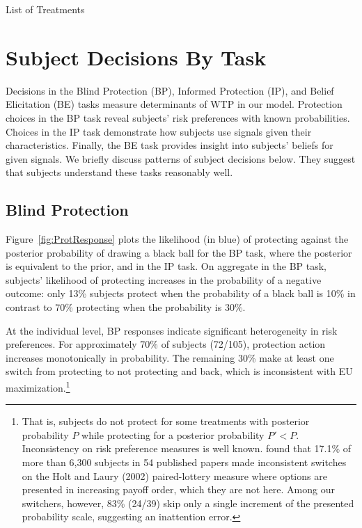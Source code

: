 \documentclass[12pt,a4paper]{article}
\begin{document}
\begin{table}[h!]
\caption{List of Treatments} \label{tab:treatments}

\end{table}


 


\vspace{20pt}
\section{Subject Decisions By Task}\label{sec:sanity}

Decisions in the Blind Protection (BP), Informed Protection (IP), and Belief Elicitation (BE) tasks measure determinants of WTP in our model. Protection choices in the BP task reveal subjects' risk preferences with known probabilities. Choices in the IP task demonstrate how subjects use signals given their characteristics. Finally, the BE task provides insight into subjects' beliefs for given signals.  We briefly discuss patterns of subject decisions below. They suggest that subjects understand these tasks reasonably well.

\subsection{Blind Protection}

Figure~\ref{fig:ProtResponse} plots the likelihood (in blue) of protecting against the posterior probability of drawing a black ball for the BP task, where the posterior is equivalent to the prior, and in the IP task. On aggregate in the BP task, subjects' likelihood of protecting increases in the probability of a negative outcome: only 13\% subjects protect when the probability of a black ball is 10\% in contrast to 70\% protecting when the probability is 30\%. 

At the individual level, BP responses indicate significant heterogeneity in risk preferences. For approximately 70\% of subjects (72/105), protection action increases monotonically in probability. The remaining 30\% make at least one switch from protecting to not protecting and back, which is inconsistent with EU maximization.\footnote{That is, subjects do not protect for some treatments with posterior probability $P$ while protecting for a posterior probability $P'<P$.  Inconsistency on risk preference measures is well known.  \citet{filippin_reconsideration_2016} found that 17.1\% of more than 6,300 subjects in 54 published papers made inconsistent switches on the Holt and Laury (2002) paired-lottery measure where options are presented in increasing payoff order, which they are not here. Among our switchers, however, 83\% (24/39) skip only a single increment of the presented probability scale, suggesting an inattention error.}
\end{document}
